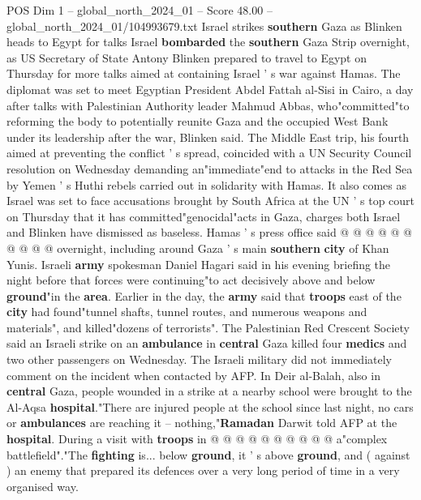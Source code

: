 \begin{textsample}{POS Dim 1 – global\_north\_2024\_01 – Score 48.00 – global\_north\_2024\_01/104993679.txt}  \label{ex:f1_pos_152}
Israel strikes \textbf{southern} Gaza as Blinken heads to Egypt for talks Israel \textbf{bombarded} the \textbf{southern} Gaza Strip overnight, as US Secretary of State Antony Blinken prepared to travel to Egypt on Thursday for more talks aimed at containing Israel ' s war against Hamas.
The diplomat was set to meet Egyptian President Abdel Fattah al-Sisi in Cairo, a day after talks with Palestinian Authority leader Mahmud Abbas, who"committed"to reforming the body to potentially reunite Gaza and the occupied West Bank under its leadership after the war, Blinken said.
The Middle East trip, his fourth aimed at preventing the conflict ' s spread, coincided with a UN Security Council resolution on Wednesday demanding an"immediate"end to attacks in the Red Sea by Yemen ' s Huthi rebels carried out in solidarity with Hamas.
It also comes as Israel was set to face accusations brought by South Africa at the UN ' s top court on Thursday that it has committed"genocidal"acts in Gaza, charges both Israel and Blinken have dismissed as baseless.
Hamas ' s press office said @ @ @ @ @ @ @ @ @ @ overnight, including around Gaza ' s main \textbf{southern} \textbf{city} of Khan Yunis.
Israeli \textbf{army} spokesman Daniel Hagari said in his evening briefing the night before that forces were continuing"to act decisively above and below \textbf{ground}"in the \textbf{area}.
Earlier in the day, the \textbf{army} said that \textbf{troops} east of the \textbf{city} had found"tunnel shafts, tunnel routes, and numerous weapons and materials", and killed"dozens of terrorists".
The Palestinian Red Crescent Society said an Israeli strike on an \textbf{ambulance} in \textbf{central} Gaza killed four \textbf{medics} and two other passengers on Wednesday.
The Israeli military did not immediately comment on the incident when contacted by AFP.
In Deir al-Balah, also in \textbf{central} Gaza, people wounded in a strike at a nearby school were brought to the Al-Aqsa \textbf{hospital}."There are injured people at the school since last night, no cars or \textbf{ambulances} are reaching it -- nothing,"\textbf{Ramadan} Darwit told AFP at the \textbf{hospital}.
During a visit with \textbf{troops} in @ @ @ @ @ @ @ @ @ @ a"complex battlefield"."The \textbf{fighting} is... below \textbf{ground}, it ' s above \textbf{ground}, and ( against ) an enemy that prepared its defences over a very long period of time in a very organised way.

\end{textsample}
